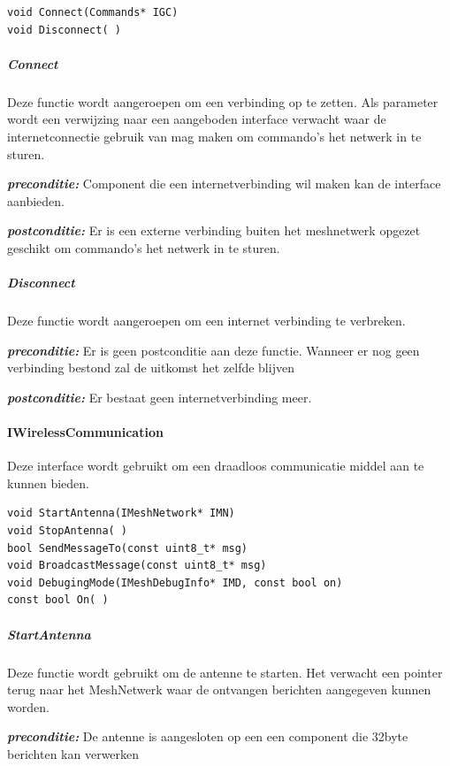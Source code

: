 \documentclass[a4paper, 11pt, oneside]{report}
\begin{document}
\begin{lstlisting}
void Connect(Commands* IGC) 
void Disconnect( )
\end{lstlisting}

\subparagraph{Connect} 
\label{DetailedDesign:ros:extern:interfaces:IInternetConnection:Connect}
Deze functie wordt aangeroepen om een verbinding op te zetten.
Als parameter wordt een verwijzing naar een aangeboden interface verwacht waar de internetconnectie gebruik van mag maken om commando's het netwerk in te sturen. 

\textbf{\textit{preconditie:}} Component die een internetverbinding wil maken kan de interface  aanbieden.

\textbf{\textit{postconditie:}} Er is een externe verbinding buiten het meshnetwerk opgezet geschikt om commando's het netwerk in te sturen.

\subparagraph{Disconnect} 
\label{DetailedDesign:ros:extern:interfaces:IInternetConnection:Disconnect}
Deze functie wordt aangeroepen om een internet verbinding te verbreken.

\textbf{\textit{preconditie:}} Er is geen postconditie aan deze functie. 
Wanneer er nog geen verbinding bestond zal de uitkomst het zelfde blijven

\textbf{\textit{postconditie:}} Er bestaat geen internetverbinding meer. 

\paragraph{IWirelessCommunication}
\label{DetailedDesign:ros:extern:interfaces:IWirelessCommunication}
Deze interface wordt gebruikt om een draadloos communicatie middel aan te kunnen bieden.

\begin{lstlisting}
void StartAntenna(IMeshNetwork* IMN)
void StopAntenna( )
bool SendMessageTo(const uint8_t* msg)
void BroadcastMessage(const uint8_t* msg)
void DebugingMode(IMeshDebugInfo* IMD, const bool on)
const bool On( )
\end{lstlisting}

\subparagraph{StartAntenna}
\label{DetailedDesign:ros:extern:interfaces:IWirelessCommunication:StartAntenna}
Deze functie wordt gebruikt om de antenne te starten. Het verwacht een pointer terug naar het MeshNetwerk waar de ontvangen berichten aangegeven kunnen worden.

\textbf{\textit{preconditie:}} De antenne is aangesloten op een een component die 32byte berichten kan verwerken
\end{document}
